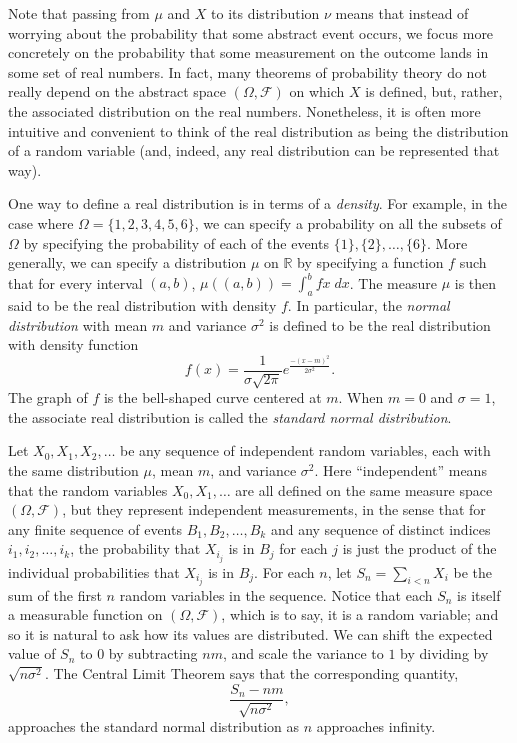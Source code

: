 \documentclass{svjour3}
\newcommand{\RR}{\mathbb{R}}
\newcommand{\mdl}[1]{{\mathcal #1}} %
\begin{document}
Note that passing from $\mu$ and $X$ to its distribution $\nu$ means that instead of worrying about the probability that some abstract event occurs, we focus more concretely on the probability that some measurement on the outcome lands in some set of real numbers. In fact, many theorems of probability theory do not really depend on the abstract space $(\Omega, \mdl F)$ on which $X$ is defined, but, rather, the associated distribution on the real numbers. Nonetheless, it is often more intuitive and convenient to think of the real distribution as being the distribution of a random variable (and, indeed, any real distribution can be represented that way). 

One way to define a real distribution is in terms of a \emph{density}. For example, in the case where $\Omega = \{1, 2, 3, 4, 5, 6\}$, we can specify a probability on all the subsets of $\Omega$ by specifying the probability of each of the events $\{1\}, \{2\}, \ldots, \{6\}$. More generally, we can specify a distribution $\mu$ on $\RR$ by specifying a function $f$ such that for every interval $(a, b)$, $\mu((a, b)) = \int_a^b f x \; \mathit{dx}$. The measure $\mu$ is then said to be the real distribution with density $f$. In particular, the \emph{normal distribution} with mean $m$ and variance $\sigma^2$ is defined to be the real distribution with density function
\[
f(x) = \frac{1}{\sigma \sqrt{2 \pi}} e^\frac{-(x - m)^2}{2 \sigma^2}. 
\]
The graph of $f$ is the bell-shaped curve centered at $m$. When $m = 0$ and $\sigma = 1$, the associate real distribution is called the \emph{standard normal distribution}.

Let $X_0, X_1, X_2, \ldots$ be any sequence of independent random variables, each with the same distribution $\mu$, mean $m$, and variance $\sigma^2$. Here ``independent'' means that the random variables $X_0, X_1, \ldots$ are all defined on the same measure space $(\Omega, \mdl F)$, but they represent independent measurements, in the sense that for any finite sequence of events $B_1, B_2, \ldots, B_k$ and any sequence of distinct indices $i_1, i_2, \ldots, i_k$, the probability that $X_{i_j}$ is in $B_j$ for each $j$ is just the product of the individual probabilities that $X_{i_j}$ is in $B_j$. For each $n$, let $S_n = \sum_{i < n} X_i$ be the sum of the first $n$ random variables in the sequence. Notice that each $S_n$ is itself a measurable function on $(\Omega, \mdl F)$, which is to say, it is a random variable; and so it is natural to ask how its values are distributed. We can shift the expected value of $S_n$ to $0$ by subtracting $n m$, and scale the variance to $1$ by dividing by $\sqrt{ n \sigma^2}$. The Central Limit Theorem says that the corresponding quantity,
\[
 \frac{S_n - nm}{\sqrt{n \sigma^2}},
\]
approaches the standard normal distribution as $n$ approaches infinity.
\end{document}

